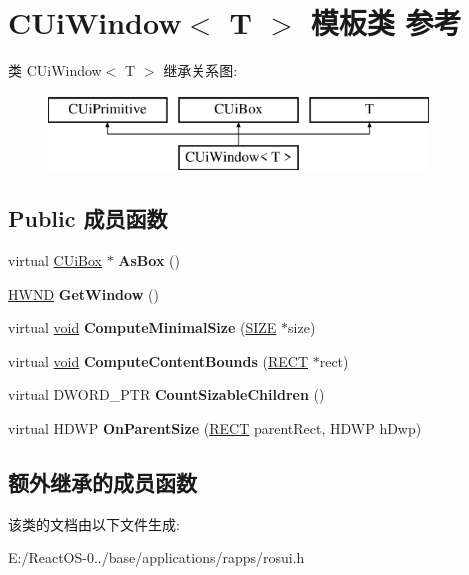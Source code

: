 \hypertarget{class_c_ui_window}{}\section{C\+Ui\+Window$<$ T $>$ 模板类 参考}
\label{class_c_ui_window}
类 C\+Ui\+Window$<$ T $>$ 继承关系图\+:\begin{figure}[H]
\begin{center}
\leavevmode
\includegraphics[height=2.000000cm]{class_c_ui_window}
\end{center}
\end{figure}
\subsection*{Public 成员函数}
\begin{DoxyCompactItemize}
\item 
\mbox{\label{class_c_ui_window_a2d0f7d08c60337a08ffd3a5a44812c65}} 
virtual \hyperlink{class_c_ui_box}{C\+Ui\+Box} $\ast$ {\bfseries As\+Box} ()
\item 
\mbox{\label{class_c_ui_window_a45b8377aaa9ff3d151889170e94cfab9}} 
\hyperlink{interfacevoid}{H\+W\+ND} {\bfseries Get\+Window} ()
\item 
\mbox{\label{class_c_ui_window_a604d0253e67a42ed65da51ffccb3e35c}} 
virtual \hyperlink{interfacevoid}{void} {\bfseries Compute\+Minimal\+Size} (\hyperlink{structtag_s_i_z_e}{S\+I\+ZE} $\ast$size)
\item 
\mbox{\label{class_c_ui_window_abd27d002008e1a2d2414779dea730b50}} 
virtual \hyperlink{interfacevoid}{void} {\bfseries Compute\+Content\+Bounds} (\hyperlink{structtag_r_e_c_t}{R\+E\+CT} $\ast$rect)
\item 
\mbox{\label{class_c_ui_window_af8c414c53cf8fafeba69a95f4ca4fc49}} 
virtual D\+W\+O\+R\+D\+\_\+\+P\+TR {\bfseries Count\+Sizable\+Children} ()
\item 
\mbox{\label{class_c_ui_window_aad3f5ecd558b45ee8ad6610335d58ca0}} 
virtual H\+D\+WP {\bfseries On\+Parent\+Size} (\hyperlink{structtag_r_e_c_t}{R\+E\+CT} parent\+Rect, H\+D\+WP h\+Dwp)
\end{DoxyCompactItemize}
\subsection*{额外继承的成员函数}


该类的文档由以下文件生成\+:\begin{DoxyCompactItemize}
\item 
E\+:/\+React\+O\+S-\/0../base/applications/rapps/rosui.\+h\end{DoxyCompactItemize}
